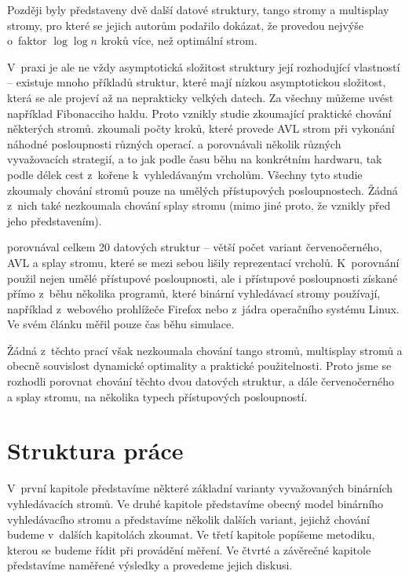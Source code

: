 Později byly představeny dvě další datové struktury, tango stromy a multisplay stromy, pro které se jejich autorům podařilo dokázat, že provedou nejvýše o~faktor $\log\log n$ kroků více, než optimální strom.

V~praxi je ale ne vždy asymptotická složitost struktury její rozhodující
vlastností -- existuje mnoho příkladů struktur, které mají nízkou
asymptotickou složitost, která se ale projeví až na neprakticky velkých datech. Za
všechny můžeme uvést například Fibonacciho haldu. Proto vznikly studie
zkoumající praktické chování některých stromů. \citet{AVLperformance} zkoumali
počty kroků, které provede AVL strom při vykonání náhodné
posloupnosti různých operací. \citet{comparison} a \citet{comparison2}
porovnávali několik různých vyvažovacích strategií, a to jak podle času běhu na konkrétním hardwaru, tak
podle délek cest z~kořene k~vyhledávaným vrcholům. Všechny tyto studie zkoumaly
chování stromů pouze na umělých přístupových posloupnostech. Žádná z~nich také
nezkoumala chování splay stromu (mimo jiné proto, že vznikly před jeho představením).


\citet{performance} porovnával celkem 20 datových struktur -- větší počet variant červenočerného, AVL a splay stromu, které se mezi sebou lišily reprezentací vrcholů. K~porovnání použil nejen umělé přístupové posloupnosti, ale i přístupové posloupnosti získané přímo z~běhu několika programů, které binární vyhledávací stromy používají, například z~webového prohlížeče Firefox nebo z~jádra operačního systému Linux. Ve svém článku měřil pouze čas běhu simulace.

Žádná z~těchto prací však nezkoumala chování tango stromů, multisplay stro\-mů a obecně souvislost dynamické optimality a praktické použitelnosti. Proto jsme se rozhodli porovnat chování těchto dvou datových struktur, a dále červenočerného a splay stromu, na několika typech přístupových posloupností.

\section*{Struktura práce}

V~první kapitole představíme některé základní varianty vyvažovaných binárních
vyhledávacích stromů. Ve druhé kapitole představíme obecný model binárního
vyhledávacího stromu a představíme několik dalších variant, jejichž chování
budeme v~dalších kapitolách zkoumat. Ve třetí kapitole popíšeme metodiku,
kterou se budeme řídit při provádění měření. Ve čtvrté a závěrečné kapitole
představíme naměřené výsledky a provedeme jejich diskusi.
